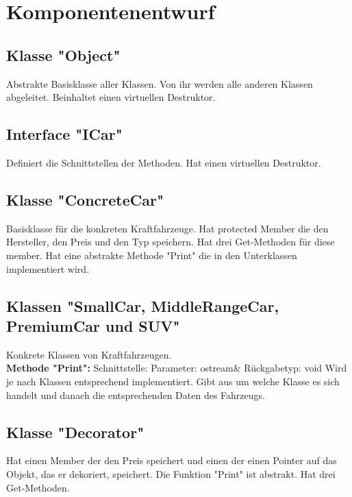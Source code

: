 \documentclass[12pt,a4paper]{article}
\begin{document}
\newpage
\section {Komponentenentwurf}
\subsection {Klasse "Object"}
Abstrakte Basisklasse aller Klassen. Von ihr werden alle anderen Klassen abgeleitet. Beinhaltet einen virtuellen Destruktor.

\subsection {Interface "ICar"}
Definiert die Schnittstellen der Methoden. Hat einen virtuellen Destruktor.
\\

\subsection {Klasse "ConcreteCar"}
Basisklasse für die konkreten Kraftfahrzeuge. Hat protected Member die den Hersteller, den Preis und den Typ speichern. Hat drei Get-Methoden für diese member. Hat eine abstrakte Methode "Print" die in den Unterklassen implementiert wird.
\\

\subsection {Klassen "SmallCar, MiddleRangeCar, PremiumCar und SUV"}
Konkrete Klassen von Kraftfahrzeugen.
\\

\textbf {Methode "Print": } 
\newline
Schnittstelle:
\newline
Parameter: ostream\&
\newline
Rückgabetyp: void
\newline
Wird je nach Klassen entsprechend implementiert. Gibt aus um welche Klasse es sich handelt und danach die entsprechenden Daten des Fahrzeugs.
\\

\subsection {Klasse "Decorator"}
Hat einen Member der den Preis speichert und einen der einen Pointer auf das Objekt, das er dekoriert, speichert. Die Funktion "Print" ist abstrakt. Hat drei Get-Methoden.
\\
\end{document}
